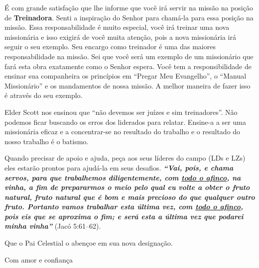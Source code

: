 	\'E com grande satisfa\c c\~ao que lhe informe que voc\^e ir\'a servir na miss\~ao na posi\c c\~ao de \textbf{Treinadora}. Senti a inspira\c c\~ao do Senhor para cham\'a-la para essa posi\c c\~ao na miss\~ao. Essa responsabilidade \'e muito especial, voc\^e ir\'a treinar uma nova mission\'aria e isso exigir\'a de voc\^e muita aten\c c\~ao, pois a nova mission\'aria ir\'a seguir o seu exemplo. Seu encargo como treinador \'e uma das maiores responsabilidade na miss\~ao. Sei que voc\^e ser\'a um exemplo de um mission\'ario que far\'a esta obra exatamente como o Senhor espera. Voc\^e tem a responsibilidade de ensinar sua companheira os princ\'ipios em ``Pregar Meu Evangelho'', o ``Manual Mission\'ario'' e os mandamentos de nossa miss\~ao. A melhor maneira de fazer isso \'e atrav\'es do seu exemplo.

Elder Scott nos ensinou que ``n\~ao devemos ser ju\'izes e sim treinadores''. N\~ao podemos ficar buscando os erros dos liderados para relatar. Ensine-a a ser uma mission\'aria eficaz e a concentrar-se no resultado do trabalho e o resultado do nosso trabalho \'e o batismo.

Quando precisar de apoio e ajuda, pe\c ca aos seus l\'ideres do campo (LDs e LZs) eles estar\~ao prontos para ajud\'a-la em seus desafios. \textbf{\textit{``Vai, pois, e chama servos, para que trabalhemos diligentemente, com \underline{todo o afinco}, na vinha, a fim de prepararmos o meio pelo qual eu volte a obter o fruto natural, fruto natural que \'e bom e mais precioso do que qualquer outro fruto. Portanto vamos trabalhar esta \'ultima vez, com \underline{todo o afinco}, pois eis que se aproxima o fim; e ser\'a esta a \'ultima vez que podarei minha vinha''}} (Jac\'o 5:61--62).

Que o Pai Celestial o aben\c coe em sua nova designa\c c\~ao.

Com amor e confian\c ca
